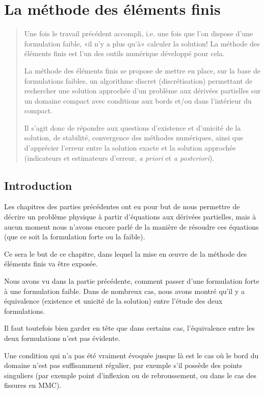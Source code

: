 \chapter{La méthode des éléments finis}\label{Ch-MEF}
\begin{abstract}
Une fois le travail précédent accompli, i.e. une fois que l'on dispose d'une
formulation faible, «il n'y a plus qu'à» calculer la solution!
La méthode des éléments finis est l'un des outils numérique développé pour cela.

La méthode des éléments finis se propose de mettre en place, sur la base de
formulations faibles, un algorithme discret (discrétisation) permettant de rechercher
une solution approchée d'un problème aux dérivées partielles sur un domaine
compact avec conditions aux bords et/ou dans l'intérieur du compact.

Il s'agit donc de répondre aux questions d'existence et d'unicité de la solution,
de stabilité, convergence des méthodes numériques, ainsi que d'apprécier
l'erreur entre la solution exacte et la solution approchée (indicateurs et estimateurs
d'erreur, \emph{a priori} et \emph{a posteriori}).
\end{abstract}

\medskip
\section{Introduction}
Les chapitres des parties précédentes ont eu pour but de nous permettre de décrire
un problème physique à partir d'équations aux dérivées partielles, mais à aucun moment nous n'avons encore
parlé de la manière de résoudre ces équations (que ce soit la formulation forte ou la faible).

Ce sera le but de ce chapitre, dans lequel la mise en œuvre de la méthode
des éléments finis va être exposée.

\medskip
Nous avons vu dans la partie précédente, comment passer d'une formulation
forte à une formulation faible.
Dans de nombreux cas, nous avons montré qu'il y a équivalence (existence et unicité de
la solution) entre l'étude des deux formulations.

Il faut toutefois bien garder en tête que dans certains cas, l'équivalence entre les deux
formulations n'est pas évidente.

Une condition qui n'a pas été vraiment évoquée jusque là est le cas où
le bord du domaine n'est pas suffisamment régulier, par exemple
s'il possède des points singuliers (par exemple point d'inflexion ou de rebroussement, ou
dans le cas des fissures en MMC).

